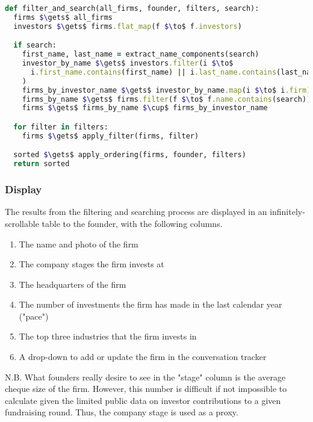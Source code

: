\begin{lstlisting}[float,frame=single,mathescape=true,language=Ruby,basicstyle=\footnotesize,columns=fullflexible,caption={Filter and Search},label={code:filter}]
def filter_and_search(all_firms, founder, filters, search):
  firms $\gets$ all_firms
  investors $\gets$ firms.flat_map(f $\to$ f.investors)

  if search:
    first_name, last_name = extract_name_components(search)
    investor_by_name $\gets$ investors.filter(i $\to$
      i.first_name.contains(first_name) || i.last_name.contains(last_name)
    )
    firms_by_investor_name $\gets$ investor_by_name.map(i $\to$ i.firm)
    firms_by_name $\gets$ firms.filter(f $\to$ f.name.contains(search))
    firms $\gets$ firms_by_name $\cup$ firms_by_investor_name

  for filter in filters:
    firms $\gets$ apply_filter(firms, filter)

  sorted $\gets$ apply_ordering(firms, founder, filters)
  return sorted
\end{lstlisting}

\subsubsection{Display}

The results from the filtering and searching process are displayed in an infinitely-scrollable table to the founder, with the following columns.

\begin{enumerate}
  \item The name and photo of the firm
  \item The company stages the firm invests at
  \item The headquarters of the firm
  \item The number of investments the firm has made in the last calendar year ("pace")
  \item The top three industries that the firm invests in
  \item A drop-down to add or update the firm in the conversation tracker
\end{enumerate}

N.B. What founders really desire to see in the "stage" column is the average cheque size of the firm. However, this number is difficult if not impossible to calculate given the limited public data on investor contributions to a given fundraising round. Thus, the company stage is used as a proxy.


